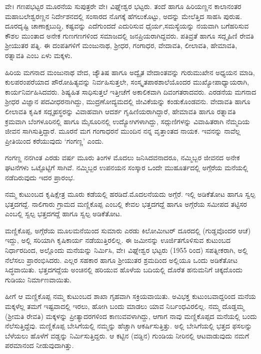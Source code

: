 {ವೇ। ಗಣಪಭಟ್ಟರ ಮೂರನೆಯ ಸುಪುತ್ರರೇ ವೇ। ವಿಘ್ನೇಶ್ವರ ಭಟ್ಟರು. ತಂದೆ ಹಾಗೂ ಹಿರಿಯಣ್ಣನ ಕಾಲಾನಂತರ ಮಹಾಬಲೇಶ್ವರಣ್ಣನ ನಿರ್ದೇಶನದಲ್ಲಿ ಸಂಸಾರದ ನೊಗಕ್ಕೆ ಹೆಗಲುಕೊಟ್ಟು, ಅದನ್ನು ಮೇಲೆತ್ತಿದ ಸಾಹಸಿ ಪುರುಷ. ದೂರದೃಷ್ಟಿ ಚಾಣಾಕ್ಷ\-ಬುದ್ಧಿ, ಕಷ್ಟವನ್ನು ಎದೆಗುಂದದೆ ಎದುರಿಸುವ ಧೈರ್ಯ,ಸಮಸ್ಯೆಯನ್ನು ನಯವಾಗಿ ಬಗೆಹರಿಸುವ ಕೌಶಲ ಮುಂತಾದ ಅನೇಕ ಗುಣಗಣಗಳಿಂದ ಸಮಾಜದಲ್ಲಿ ಜನಪ್ರಿಯರಾಗಿದ್ದವರು. ಪತಿವ್ರತೆ ಹಾಗೂ ಸದ್ಗೃಹಿಣಿ ರೇವತಿ ಶ್ರೀಯುತರ ಪತ್ನಿ. ಈ ದಂಪತಿ\-ಗಳಿಗೆ ಮಂಜುನಾಥ, ಶ್ರೀಧರ, ಗಂಗಾಧರ, ವೇದಾವತಿ, ಲೀಲಾವತಿ, ಹೇಮಾವತಿ, ರತ್ನಾವತಿ ಎಂಬ ಏಳು ಮಕ್ಕಳು.

ಹಿರಿಯ ಮಗನಾದ ಮಂಜುನಾಥ ವೇದ, ಜ್ಯೌತಿಷ ಹಾಗೂ ಅದ್ವೈತ ವೇದಾಂತ\-ವನ್ನು ಗುರುಮುಖೇನ ಅಧ್ಯಯನ ಮಾಡಿ, ಕುಲಪರಂಪರೆಯಾದ ಪೌರೋಹಿತ್ಯವನ್ನು ನಿರ್ವಹಿಸುತ್ತಲೇ, ಸಂಸ್ಕೃತಪಾಠಶಾಲೆಯೊಂದರ ಮುಖ್ಯೋಪಾಧ್ಯಾಯರಾಗಿ, ಕಾರ್ಯನಿರ್ವಹಿಸಿದವರು. ಶಿಷ್ಯಹಿತ ಸಾಧಿಸುತ್ತಲೆ ಇತ್ತೀಚೆಗೆ ಅಕಾಲಿಕವಾಗಿ ದಿವಂಗತರಾದವರು. ಎರಡನೆಯ ಮಗನಾದ ಶ್ರೀಧರ ವಿಜ್ಞಾನ ಪದವೀಧರನಾಗಿದ್ದು, ಮುದ್ರಣೋದ್ಯಮದಲ್ಲಿ ಜೀವಿಕೆಯನ್ನು ಕಂಡುಕೊಂಡವನು. ವೇದಾವತಿ ಹಾಗೂ ಲೀಲಾವತಿ ಕೃಷಿಕ ಸದ್ಗೃಹಸ್ಥರನ್ನು ವಿವಾಹವಾಗಿ ಆದರ್ಶ ಗೃಹಿಣಿಯರಾಗಿದ್ದಾರೆ, ಹೇಮಾವತಿ ಹಾಗೂ ರತ್ನಾವತಿ ಕ್ರಮವಾಗಿ ಬೆಂಗಳೂರಿನಲ್ಲಿ ಹಾಗೂ ಮೈಸೂರಿನಲ್ಲಿ ಉದ್ಯೋಗಿಗಳಾಗಿದ್ದು, ಸದ್ಗುಣಿಗಳನ್ನು ವಿವಾಹಿತರಾಗಿ ನೆಮ್ಮದಿಯ ಜೀವನ ಸಾಗಿಸುತ್ತಿದ್ದಾರೆ. ಮೂರನೆ ಮಗ ಗಂಗಾಧರನೆ ಮುಂದಿನ ನನ್ನ ವೃತ್ತಾಂತದ ನಾಯಕ. ಇವನನ್ನು ನಾವೆಲ್ಲ ಪ್ರೀತಿಯಿಂದ ಕರೆಯುವುದು ‘ಗಂಗಣ್ಣ’ ಎಂದು.
\vskip 2pt

ಗಂಗಣ್ಣ ನನಗಿಂತ ಎರಡು ವರ್ಷ ಮೂರು ತಿಂಗಳ ಮೊದಲು ಜನಿಸಿದವನಾದರೂ, ನಮ್ಮಿಬ್ಬರ ಜೀವನದ ಅನೇಕ ಘಟನೆಗಳು ಒಟ್ಟೊಟ್ಟಿಗೆ ಸಾಗಿವೆ. ನಮ್ಮಿಬ್ಬರ ಉಪನಯನ ಸಂಸ್ಕಾರ ಒಂದೇ ಮುಹೂರ್ತದಲ್ಲಿ ಅಗ್ಗೆರೆಯ ಮನೆಯಲ್ಲಿ ನಡೆದಿರುವುದು ಇದರ ಪ್ರಾರಂಭ.
\vskip 2pt

ನಮ್ಮ ಕುಟುಂಬದ  ಕೃಷಿಕ್ಷೇತ್ರ ಮೂರು ಕಡೆಯಲ್ಲಿ ಹರಡಿದೆ.ಮೊದಲನೆಯದು ಅಗ್ಗೆರೆ. ಇಲ್ಲಿ ಅಡಿಕೆತೋಟ ಹಾಗೂ ಸ್ವಲ್ಪ ಭತ್ತದಗದ್ದೆ. ನಾಲಿಗಾರು ಗ್ರಾಮದ ಮಣ್ಣಿಕೊಪ್ಪ ಎಂಬಲ್ಲಿ ಕೇವಲ ಭತ್ತದಗದ್ದೆ ಹಾಗೂ ಅಗ್ಗೆರೆಯ ಸಮೀಪದ ತಟ್ಟಿಸರ ಎಂಬಲ್ಲಿ ಸ್ವಲ್ಪ ಭತ್ತದ\-ಗದ್ದೆ ಹಾಗೂ ಸ್ವಲ್ಪ ಅಡಿಕೆತೋಟ.
\vskip 2pt

ಮಣ್ಣಿಕೊಪ್ಪ, ಅಗ್ಗೆರೆಯ ಮೂಲಮನೆಯಿಂದ ಸುಮಾರು ಎರಡು ಕಿಲೋ\-ಮೀಟರ್ ದೂರದಲ್ಲಿ (ಗುಡ್ಡವೊಂದರ ಆಚೆ) ಇದ್ದು, ಅಲ್ಲಿ ಸರಿಯಾಗಿ ಕೃಷಿಕಾರ್ಯ ನಡೆಯುತ್ತಿರಲಿಲ್ಲ. ಈ ಜಮೀನನ್ನು ಊರ್ಜಿತಗೊಳಿಸುವ ಕುಟುಂಬದ ನಿರ್ಧಾರದಿಂದ, ಅಲ್ಲೊಂದು ಮನೆಯನ್ನು ನಿರ್ಮಿಸಿ, ವೇ। ವಿಘ್ನೇಶ್ವರ ಭಟ್ಟರು (1955 ರಿಂದ) ಸಪತ್ನೀಕರಾಗಿ, ಅಲ್ಲಿ ನೆಲೆಸಲು ಪ್ರಾರಂಭಿಸಿದರು. ಎಲ್ಲರ ಸಹಕಾರ ಹಾಗೂ ಶ್ರೀಯುತರ ಶ್ರಮದಿಂದ ಅಲ್ಲಿಯೂ ಒಂದು ಅಡಿಕೆತೋಟ ಸಿದ್ಧವಾಯಿತು. ಭತ್ತದಗದ್ದೆಯ ಅಂಚಿನಲ್ಲಿ ಹರಿಯುವ ಹೊಳೆಯ ಬದಿಯಲ್ಲಿ ದೊರೆತ ಹನುಮನಿಗೆ ಚಿಕ್ಕದೊಂದು  ಗುಡಿಯು ನಿರ್ಮಾಣ\-ವಾಯಿತು. 
\vskip 2pt

ಹೀಗೆ ಆ ಮಣ್ಣಿಕೊಪ್ಪ ನಮ್ಮ ಕುಟುಂಬದ ಶಾಖಾ ಗೃಹವಾಗಿ ಸಕ್ರಿಯವಾಯಿತು. ಅವಿಭಕ್ತ ಕುಟುಂಬವಾದ್ದರಿಂದ ಮನೆಯ ಮಕ್ಕಳೆಲ್ಲ ತಮಗೆ ಇಷ್ಟವಾದಲ್ಲಿ ಇರಲು, ಹೋಗಿ  \enginline{-}  ಬಂದು ಮಾಡಲು ಯಾವ ನಿರ್ಬಂಧವಿರಲಿಲ್ಲ.  ನಮ್ಮ ದೊಡ್ಡಮ್ಮ (ಶ್ರೀಮತಿ ರೇವತಿ) ಮಕ್ಕಳನ್ನು ಪ್ರೀತ್ಯಾದರಗಳಿಂದ ಕಾಣುವವಳಾಗಿದ್ದು, ಆಗಾಗ ನಾವು ಮಣ್ಣಿ\-ಕೊಪ್ಪದ ಮನೆಯಲ್ಲಿ ಬಂದು ನೆಲೆಸುತ್ತಿದ್ದೆವು. ಮಣ್ಣಿಕೊಪ್ಪ ಬೇಸಿಗೆಯಲ್ಲಿ ನಮ್ಮನ್ನು ಹೆಚ್ಚಾಗಿ ಆಕರ್ಷಿಸುತ್ತಿತ್ತು. ಅಲ್ಲಿ ಬೇಸಿಗೆಯಲ್ಲಿ ಭತ್ತದ ಫಸಲನ್ನು ಬೆಳೆಯಲು ಹೊಳೆಗೆ ವಡ್ಡನ್ನು ನಿರ್ಮಿಸುತ್ತಿದ್ದರು. ಆ ಕಟ್ಟಿನ (ವಡ್ಡಿನ) ಗುಂಡಿಯ ನೀರಿನಲ್ಲಿ ಆಟವಾಡುವುದು ನಮಗೆ ಪರಮಾನಂದ ನೀಡುವುದಾಗಿತ್ತು.
\vskip 2pt

}
